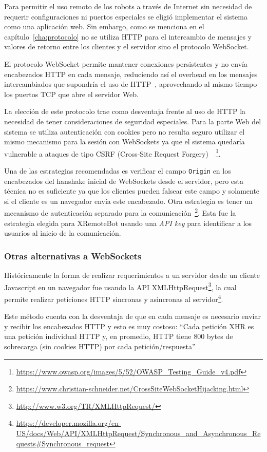 Para permitir el uso remoto de los robots a través de Internet sin necesidad
de requerir configuraciones ni puertos especiales se eligió implementar el
sistema como una
aplicación web. Sin embargo, como se menciona en el
capítulo~\ref{cha:protocolo} no se utiliza HTTP para el intercambio de
mensajes y valores de retorno entre los clientes y el servidor sino el
protocolo WebSocket.

El protocolo WebSocket permite mantener conexiones persistentes y no envía
encabezados HTTP en cada mensaje, reduciendo así el overhead en los mensajes
intercambiados que supondría el uso de HTTP~\citep{wang_2013}, aprovechando al
mismo tiempo los puertos TCP que abre el servidor Web.

La elección de este protocolo trae como desventaja frente al uso de HTTP la
necesidad de tener consideraciones de seguridad especiales. Para la parte
Web del sistema se utiliza autenticación con cookies pero no resulta seguro
utilizar el mismo mecanismo para la sesión con WebSockets ya que el sistema
quedaría vulnerable a ataques de tipo CSRF (Cross-Site Request
Forgery)~\citep{owasp_2014}~\footnote{
\url{https://www.owasp.org/images/5/52/OWASP_Testing_Guide_v4.pdf}}.

Una de las estrategias recomendadas es verificar el campo \texttt{Origin}
en los encabezados del hanshake inicial de WebSockets
desde el servidor, pero esta técnica no es suficiente ya que los
clientes pueden falsear este campo y solamente si el cliente es un navegador
envía este encabezado.
Otra estrategia es tener un mecanismo de autenticación
separado para la comunicación~\footnote{\url{https://www.christian-schneider.net/CrossSiteWebSocketHijacking.html}}.
Esta fue la estrategia elegida para XRemoteBot usando una \textit{API key}
para identificar a los usuarios al inicio de la comunicación.

\subsubsection{Otras alternativas a WebSockets}
Históricamente la forma de realizar requerimientos a un servidor desde un
cliente Javascript en un navegador fue usando la API
XMLHttpRequest\footnote{\url{http://www.w3.org/TR/XMLHttpRequest/}}, la
cual permite realizar peticiones HTTP sincronas y asincronas al
servidor\footnote{\url{https://developer.mozilla.org/en-US/docs/Web/API/XMLHttpRequest/Synchronous_and_Asynchronous_Requests\#Synchronous_request}}.

Este método cuenta con la desventaja de que en cada mensaje es necesario
enviar y recibir los encabezados HTTP y esto es muy costoso:
``Cada petición XHR es una petición individual HTTP y, en promedio, HTTP
tiene 800 bytes de sobrecarga (sin cookies HTTP) por cada
petición/respuesta''~\citep{grigorik_2013}.

